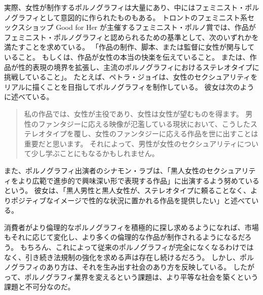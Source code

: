\documentclass[paper=a4,book,openany]{jlreq}
\begin{document}
実際、女性が制作するポルノグラフィは大量にあり、中にはフェミニスト・ポルノグラフィとして意図的に作られたものもある。
トロントのフェミニスト系セックスショップ Good for Her が主催するフェミニスト・ポルノ賞では、作品がフェミニスト・ポルノグラフィと認められるための基準として、次のいずれかを満たすことを求めている。
「作品の制作、脚本、または監督に女性が関与していること。
もしくは、作品が女性の本当の快楽を伝えていること。
または、作品が性的表現の境界を拡張し、主流のポルノグラフィにおけるステレオタイプに挑戦していること」\citep{lust11:_what_is_your_defin_femin_porn}。
たとえば、ペトラ・ジョイは、女性のセクシュアリティをリアルに描くことを目指してポルノグラフィを制作している。
彼女は次のように述べている。

\begin{quote}
私の作品では、女性が主役であり、女性は女性が望むものを得ます。
男性のファンタジーに応える映像が氾濫している現状において、こうしたステレオタイプを覆し、女性のファンタジーに応える作品を世に出すことは重要だと思います。
それによって、男性が女性のセクシュアリティについて少し学ぶことにもなるかもしれません。
\citep{smith14:_porn_produc}
\end{quote}

また、ポルノグラフィ出演者のシナモン・ラブは、「黒人女性のセクシュアリティをより広範で進歩的で興味深い形で表現する作品」に出演するよう努めているという。
彼女は、「黒人男性と黒人女性が、ステレオタイプに頼ることなく、よりポジティブなイメージで性的な状況に置かれる作品を提供したい」と述べている\citep{love13:_quest_femin}。

消費者がより倫理的なポルノグラフィを積極的に探し求めるようになれば、市場もそれに応じて変化し、より多くの倫理的な作品が制作されるようになるだろう。
もちろん、これによって従来のポルノグラフィが完全になくなるわけではなく、引き続き法規制の強化を求める声は存在し続けるだろう。
しかし、ポルノグラフィのあり方は、それを生み出す社会のあり方を反映している。
したがって、ポルノグラフィ業界を変えるという課題は、より平等な社会を築くという課題と不可分なのだ。
\end{document}
